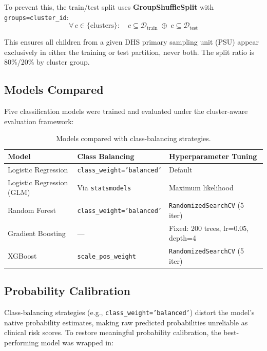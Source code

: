 \documentclass[12pt, a4paper]{article}
\begin{document}
To prevent this, the train/test split uses \textbf{GroupShuffleSplit} with \texttt{groups=cluster\_id}:
\[
\forall\, c \in \{\text{clusters}\}: \quad c \subseteq \mathcal{D}_{\text{train}} \;\oplus\; c \subseteq \mathcal{D}_{\text{test}}
\]

This ensures all children from a given DHS primary sampling unit (PSU) appear exclusively in either the training or test partition, never both. The split ratio is 80\%/20\% by cluster group.

\subsection{Models Compared}

Five classification models were trained and evaluated under the cluster-aware evaluation framework:

\begin{table}[H]
\centering
\caption{Models compared with class-balancing strategies.}
\label{tab:models}
\begin{tabular}{lll}
\toprule
\textbf{Model} & \textbf{Class Balancing} & \textbf{Hyperparameter Tuning} \\
\midrule
Logistic Regression         & \texttt{class\_weight='balanced'} & Default \\
Logistic Regression (GLM)   & Via \texttt{statsmodels}          & Maximum likelihood \\
Random Forest               & \texttt{class\_weight='balanced'} & \texttt{RandomizedSearchCV} (5 iter) \\
Gradient Boosting           & —                                 & Fixed: 200 trees, lr=0.05, depth=4 \\
XGBoost                     & \texttt{scale\_pos\_weight}       & \texttt{RandomizedSearchCV} (5 iter) \\
\bottomrule
\end{tabular}
\end{table}

\subsection{Probability Calibration}

Class-balancing strategies (e.g., \texttt{class\_weight='balanced'}) distort the model's native probability estimates, making raw predicted probabilities unreliable as clinical risk scores. To restore meaningful probability calibration, the best-performing model was wrapped in:
\end{document}
